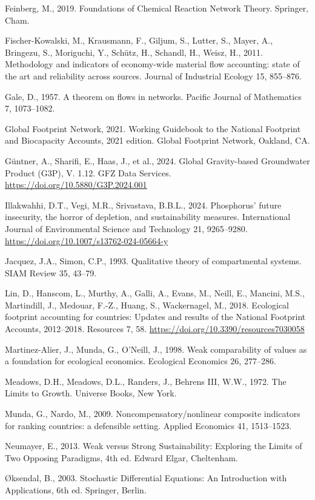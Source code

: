\documentclass[11pt]{article}
\begin{document}
Feinberg, M., 2019. Foundations of Chemical Reaction Network Theory. Springer, Cham.

Fischer-Kowalski, M., Krausmann, F., Giljum, S., Lutter, S., Mayer, A., Bringezu, S., Moriguchi, Y., Sch\"{u}tz, H., Schandl, H., Weisz, H., 2011. Methodology and indicators of economy-wide material flow accounting: state of the art and reliability across sources. Journal of Industrial Ecology 15, 855--876.

Gale, D., 1957. A theorem on flows in networks. Pacific Journal of Mathematics 7, 1073--1082.

Global Footprint Network, 2021. Working Guidebook to the National Footprint and Biocapacity Accounts, 2021 edition. Global Footprint Network, Oakland, CA.

G\"{u}ntner, A., Sharifi, E., Haas, J., et al., 2024. Global Gravity-based Groundwater Product (G3P), V. 1.12. GFZ Data Services. \url{https://doi.org/10.5880/G3P.2024.001}

Illakwahhi, D.T., Vegi, M.R., Srivastava, B.B.L., 2024. Phosphorus' future insecurity, the horror of depletion, and sustainability measures. International Journal of Environmental Science and Technology 21, 9265--9280. \url{https://doi.org/10.1007/s13762-024-05664-y}

Jacquez, J.A., Simon, C.P., 1993. Qualitative theory of compartmental systems. SIAM Review 35, 43--79.

Lin, D., Hanscom, L., Murthy, A., Galli, A., Evans, M., Neill, E., Mancini, M.S., Martindill, J., Medouar, F.-Z., Huang, S., Wackernagel, M., 2018. Ecological footprint accounting for countries: Updates and results of the National Footprint Accounts, 2012--2018. Resources 7, 58. \url{https://doi.org/10.3390/resources7030058}

Martinez-Alier, J., Munda, G., O'Neill, J., 1998. Weak comparability of values as a foundation for ecological economics. Ecological Economics 26, 277--286.

Meadows, D.H., Meadows, D.L., Randers, J., Behrens III, W.W., 1972. The Limits to Growth. Universe Books, New York.

Munda, G., Nardo, M., 2009. Noncompensatory/\allowbreak{}nonlinear composite indicators for ranking countries: a defensible setting. Applied Economics 41, 1513--1523.

Neumayer, E., 2013. Weak versus Strong Sustainability: Exploring the Limits of Two Opposing Paradigms, 4th ed. Edward Elgar, Cheltenham.

\O{}ksendal, B., 2003. Stochastic Differential Equations: An Introduction with Applications, 6th ed. Springer, Berlin.
\end{document}
